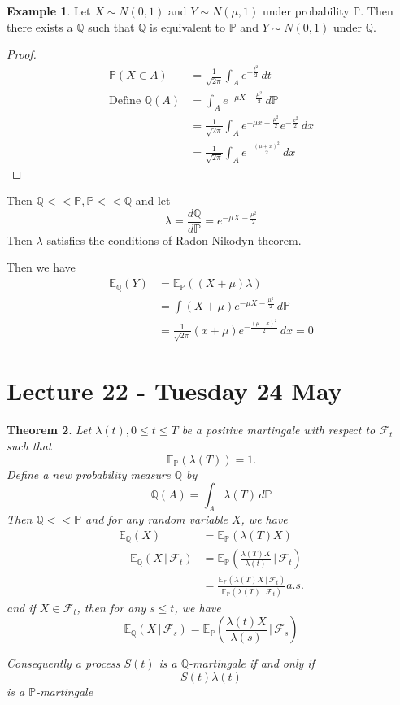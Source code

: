 \documentclass[10pt, oneside, reqno]{amsart}
\theoremstyle{plain}%
\newtheorem{thm}{Theorem}[section]
\theoremstyle{definition}
\newtheorem{exmp}[thm]{Example}
\theoremstyle{remark}
\newcommand{\given}{ \, | \,}
\newcommand{\Q}{\mathbb{Q}}
\renewcommand{\P}{\mathbb{P}}
\newcommand{\E}{\mathbb{E}}
\newcommand{\sigf}{\mathcal{F}}
\begin{document}
\begin{exmp}
    Let $X \sim N(0, 1)$ and $Y \sim N(\mu, 1)$ under probability $\P$.  Then there exists a $\Q$ such that $\Q$ is equivalent to $\P$ and $Y \sim N(0, 1)$ under $\Q$.  
\end{exmp}
\begin{proof}
    \begin{align*}
        \P(X \in A) &= \frac{1}{\sqrt{2 \pi}} \int_A e^{-\frac{t^2}{2}} \, dt \\
        \text{Define } \Q(A)    &= \int_A e^{- \mu X - \frac{\mu^2}{2}} \, d\P  \\
                            &= \frac{1}{\sqrt{2 \pi}} \int_A e^{- \mu x - \frac{\mu^2}{2}} e^{-\frac{x^2}{2}} \, dx \\
                            &= \frac{1}{\sqrt{2 \pi}} \int_A e^{-\frac{(\mu + x)^2}{2}} \, dx
    \end{align*}  
\end{proof}  Then $\Q << \P, \P << \Q$ and let \[
    \lambda = \frac{d\Q}{d\P} = e^{-\mu X - \frac{\mu^2}{2}}
\]  Then $\lambda$ satisfies the conditions of Radon-Nikodyn theorem.  

Then we have \begin{align*}
    \E_\Q(Y) &= \E_\P((X + \mu) \lambda) \\
            &= \int (X + \mu) e^{-\mu X - \frac{\mu^2}{2}} \, d\P \\
            &= \frac{1}{\sqrt{2 \pi}} (x + \mu) e^{- \frac{(\mu + x)^2}{2}} \, dx = 0
\end{align*}
\section{Lecture 22 - Tuesday 24 May} %
\label{sec:lecture_22_tuesday_24_may}

\begin{thm}
    Let $\lambda(t), 0 \leq t \leq T$ be a positive martingale with respect to $\sigf_t$ such that \[
        \E_\P(\lambda(T)) = 1.  
    \]  Define a new probability measure $\Q$ by \[
        \Q(A) = \int_A \lambda(T) \, d\P
    \]  Then $\Q << \P$ and for any random variable $X$, we have \begin{align*}
        \E_\Q(X) &= \E_\P(\lambda(T) X)\\
         \quad \E_\Q(X \given \sigf_t) &= \E_\P \left( \frac{\lambda(T) X}{\lambda(t)} \given \sigf_t \right) \tag{$\star$} \\
        &= \frac{\E_\P(\lambda(T) X \given \sigf_t )}{\E_\P(\lambda(T) \given \sigf_t)}  a.s.   
    \end{align*}
     and if $X \in \sigf_t$, then for any $s \leq t$, we have \[
        \E_\Q(X \given \sigf_s) = \E_\P \left( \frac{\lambda(t) X}{\lambda(s)} \given \sigf_s \right) \tag{$\star \star$}
    \]
    
    Consequently a process $S(t)$ is a $\Q$-martingale if and only if \[
        S(t) \lambda(t) \tag{$\dagger$}
    \] is a $\P$-martingale
\end{thm}
\newcommand{\indic}[1]{\mathbf{1}_{#1}}
\end{document}
